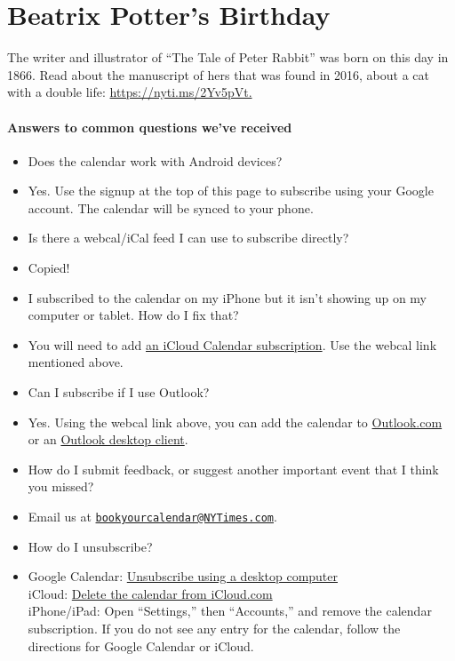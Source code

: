 \hypertarget{beatrix-potters-birthday-1}{%
\section{Beatrix Potter's Birthday}\label{beatrix-potters-birthday-1}}

The writer and illustrator of ``The Tale of Peter Rabbit'' was born on
this day in 1866. Read about the manuscript of hers that was found in
2016, about a cat with a double life:
\href{https://nyti.ms/2Yv5pVt?smid=bookscal}{https://nyti.ms/2Yv5pVt.}

\hypertarget{answers-to-common-questions-weve-received}{%
\paragraph{Answers to common questions we've
received}\label{answers-to-common-questions-weve-received}}

\begin{itemize}
\item
  Does the calendar work with Android devices?
\item
  Yes. Use the signup at the top of this page to subscribe using your
  Google account. The calendar will be synced to your phone.
\item
  Is there a webcal/iCal feed I can use to subscribe directly?
\item
  Copied!
\item
  I subscribed to the calendar on my iPhone but it isn't showing up on
  my computer or tablet. How do I fix that?
\item
  You will need to add
  \href{https://support.apple.com/en-us/HT202361}{an iCloud Calendar
  subscription}. Use the webcal link mentioned above.
\item
  Can I subscribe if I use Outlook?
\item
  Yes. Using the webcal link above, you can add the calendar to
  \href{https://support.office.com/en-us/article/Import-or-subscribe-to-a-calendar-in-Outlook-com-or-Outlook-on-the-web-cff1429c-5af6-41ec-a5b4-74f2c278e98c}{Outlook.com}
  or an
  \href{https://support.office.com/en-us/article/View-and-subscribe-to-Internet-Calendars-7CD5D35A-4A90-4D70-A2F7-F6FADD7E2D9A}{Outlook
  desktop client}.
\item
  How do I submit feedback, or suggest another important event that I
  think you missed?
\item
  Email us at
  \href{mailto:bookyourcalendar@NYTimes.com}{\nolinkurl{bookyourcalendar@NYTimes.com}}.
\item
  How do I unsubscribe?
\item
  Google Calendar:
  \href{https://support.google.com/calendar/answer/37188}{Unsubscribe
  using a desktop computer}\\
  iCloud: \href{https://support.apple.com/kb/PH2679?locale=en_US}{Delete
  the calendar from iCloud.com}\\
  iPhone/iPad: Open ``Settings,'' then ``Accounts,'' and remove the
  calendar subscription. If you do not see any entry for the calendar,
  follow the directions for Google Calendar or iCloud.
\end{itemize}


